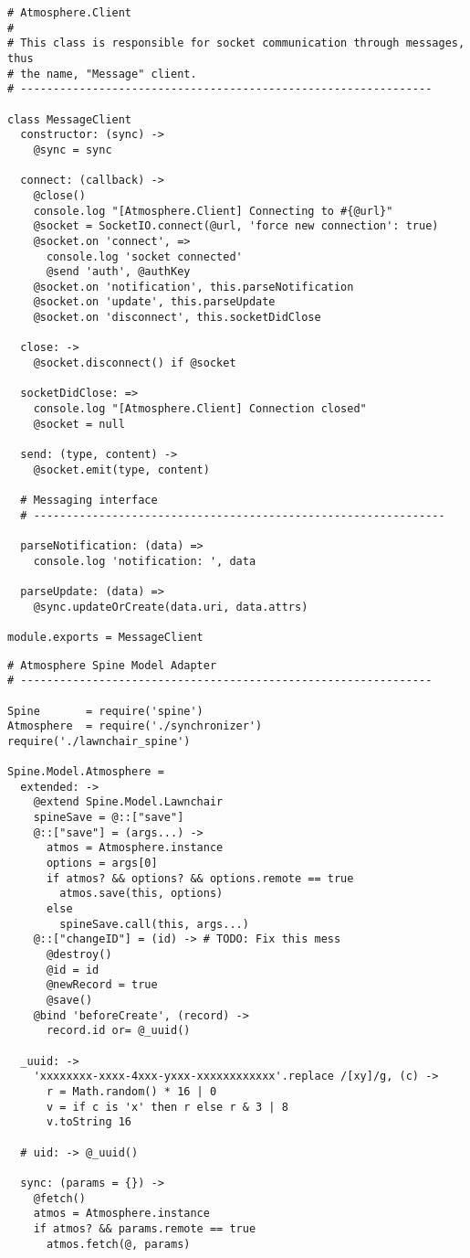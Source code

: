 \begin{lstlisting}[caption=message\_client.coffee]
# Atmosphere.Client
#
# This class is responsible for socket communication through messages, thus
# the name, "Message" client.
# ---------------------------------------------------------------

class MessageClient
  constructor: (sync) ->
    @sync = sync

  connect: (callback) ->
    @close()
    console.log "[Atmosphere.Client] Connecting to #{@url}"
    @socket = SocketIO.connect(@url, 'force new connection': true)
    @socket.on 'connect', =>
      console.log 'socket connected'
      @send 'auth', @authKey
    @socket.on 'notification', this.parseNotification
    @socket.on 'update', this.parseUpdate
    @socket.on 'disconnect', this.socketDidClose

  close: ->
    @socket.disconnect() if @socket

  socketDidClose: =>
    console.log "[Atmosphere.Client] Connection closed"
    @socket = null

  send: (type, content) ->
    @socket.emit(type, content)
  
  # Messaging interface
  # ---------------------------------------------------------------

  parseNotification: (data) =>
    console.log 'notification: ', data
  
  parseUpdate: (data) =>
    @sync.updateOrCreate(data.uri, data.attrs)

module.exports = MessageClient
\end{lstlisting}

\begin{lstlisting}[caption=spine.coffee]
# Atmosphere Spine Model Adapter
# ---------------------------------------------------------------

Spine       = require('spine')
Atmosphere  = require('./synchronizer')
require('./lawnchair_spine')

Spine.Model.Atmosphere =
  extended: ->
    @extend Spine.Model.Lawnchair
    spineSave = @::["save"]
    @::["save"] = (args...) ->
      atmos = Atmosphere.instance
      options = args[0]
      if atmos? && options? && options.remote == true
        atmos.save(this, options)
      else
        spineSave.call(this, args...)
    @::["changeID"] = (id) -> # TODO: Fix this mess
      @destroy()
      @id = id
      @newRecord = true
      @save()
    @bind 'beforeCreate', (record) ->
      record.id or= @_uuid()

  _uuid: ->
    'xxxxxxxx-xxxx-4xxx-yxxx-xxxxxxxxxxxx'.replace /[xy]/g, (c) ->
      r = Math.random() * 16 | 0
      v = if c is 'x' then r else r & 3 | 8
      v.toString 16
  
  # uid: -> @_uuid()

  sync: (params = {}) ->
    @fetch()
    atmos = Atmosphere.instance
    if atmos? && params.remote == true
      atmos.fetch(@, params)


\end{lstlisting}

